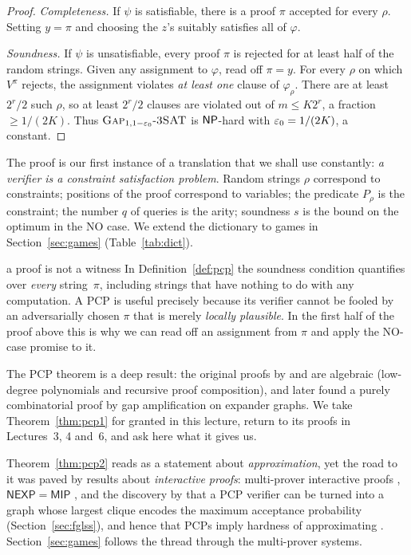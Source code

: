 \begin{proof}
\emph{Completeness.}  If $\psi$ is satisfiable, there is a proof $\pi$ accepted for every $\rho$.  Setting $y=\pi$ and
choosing the $z$'s suitably satisfies all of $\varphi$.

\emph{Soundness.}  If $\psi$ is unsatisfiable, every proof $\pi$ is rejected for at least half of
the random strings.  Given any assignment to $\varphi$, read off $\pi=y$.  For every $\rho$ on which $V^\pi$
rejects, the assignment violates \emph{at least one} clause of $\varphi_\rho$.  There are at least $2^{r}/2$
such $\rho$, so at least $2^r/2$ clauses are violated out of $m\le K2^r$, \ie a fraction
$\ge 1/(2K)$.  Thus $\textsc{Gap}_{1,1-\varepsilon_0}\text{-}\textsc{3SAT}$ is $\mathsf{NP}$-hard with $\varepsilon_0=1/(2K)$, a constant.
\end{proof}

\begin{remark}[A dictionary]
The proof is our first instance of a translation that we shall use constantly:
\emph{a verifier is a constraint satisfaction problem}.  Random strings $\rho$ correspond to
constraints; positions of the proof correspond to variables; the predicate $P_\rho$ is the
constraint; the number $q$ of queries is the arity; soundness $s$ is the bound on the optimum
in the NO case.  We extend the dictionary to games in Section~\ref{sec:games}
(Table~\ref{tab:dict}).
\end{remark}

\begin{pitfall}{a proof is not a witness}
In Definition~\ref{def:pcp} the soundness condition quantifies over \emph{every} string~$\pi$,
including strings that have nothing to do with any computation.  A PCP is useful precisely
because its verifier cannot be fooled by an adversarially chosen $\pi$ that is merely
\emph{locally plausible}.  In the first half of the proof above this is why we can read off
an assignment from $\pi$ and apply the NO-case promise to it.
\end{pitfall}

The PCP theorem is a deep result: the original proofs by \citet{AroraSafra98} and
\citet{ALMSS98} are algebraic (low-degree polynomials and recursive proof composition), and \citet{Dinur07}
later found a purely combinatorial proof by gap amplification on expander graphs.  We take
Theorem~\ref{thm:pcp1} for granted in this lecture, return to its proofs in
Lectures~3, 4 and~6, and ask here what it gives us.

\begin{remark}
Theorem~\ref{thm:pcp2} reads as a statement about \emph{approximation}, yet the road to it was
paved by results about \emph{interactive proofs}: multi-prover interactive proofs
\citep{BGKW88}, $\mathsf{NEXP}=\mathsf{MIP}$ \citep{BFL91}, and the discovery by
\citet{FGLSS96} that a PCP verifier can be turned into a graph whose largest clique encodes the
maximum acceptance probability (Section~\ref{sec:fglss}), and hence that PCPs imply
hardness of approximating .  Section~\ref{sec:games} follows the thread through
the multi-prover systems.
\end{remark}


